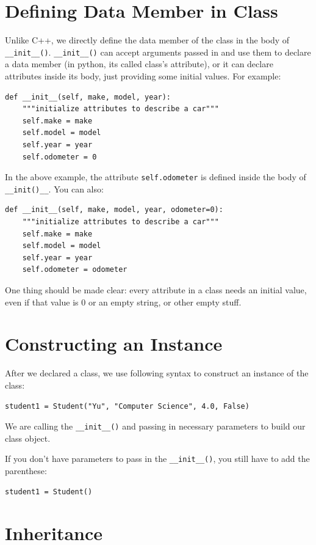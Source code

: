 \documentclass[12pt]{book}
\begin{document}
\section{Defining Data Member in Class}
\label{sec:org4844858}
Unlike C++, we directly define the data member of the class in the body of \texttt{\_\_init\_\_()}. \texttt{\_\_init\_\_()} can accept arguments passed in and use them to declare a data member (in python, its called class's attribute), or it can declare attributes inside its body, just providing some initial values. For example:
\begin{verbatim}
def __init__(self, make, model, year):
    """initialize attributes to describe a car"""
    self.make = make
    self.model = model
    self.year = year
    self.odometer = 0
\end{verbatim}
In the above example, the attribute \texttt{self.odometer} is defined inside the body of \texttt{\_\_init()\_\_}. You can also:
\begin{verbatim}
def __init__(self, make, model, year, odometer=0):
    """initialize attributes to describe a car"""
    self.make = make
    self.model = model
    self.year = year
    self.odometer = odometer
\end{verbatim}

One thing should be made clear: every attribute in a class needs an initial value, even if that value is 0 or an empty string, or other empty stuff.
\section{Constructing an Instance}
\label{sec:org9f8f3ec}
After we declared a class, we use following syntax to construct an instance of the class:
\begin{verbatim}
student1 = Student("Yu", "Computer Science", 4.0, False)
\end{verbatim}
We are calling the \texttt{\_\_init\_\_()} and passing in necessary parameters to build our class object.

If you don't have parameters to pass in the \texttt{\_\_init\_\_()}, you still have to add the parenthese:
\begin{verbatim}
student1 = Student()
\end{verbatim}
\section{Inheritance}
\label{sec:org875c3f1}
\end{document}

